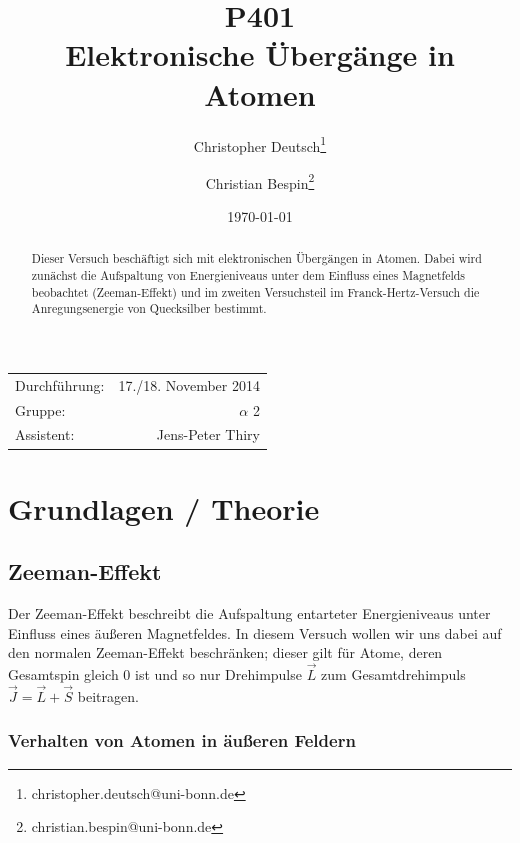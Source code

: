 \documentclass[11pt, a4paper]{article}
\title{P401 \\ Elektronische Übergänge in Atomen}
\author{Christopher Deutsch\footnote{christopher.deutsch@uni-bonn.de} \and Christian Bespin\footnote{christian.bespin@uni-bonn.de}}
\date{\today}
\begin{document}
\begin{titlepage}

\maketitle

\begin{center}
\begin{tabular}{l r}
Durchführung: & 17./18. November 2014 \\
Gruppe: & $\alpha$ 2 \\
Assistent: & Jens-Peter Thiry
\end{tabular}
\end{center}

\begin{abstract}
\noindent
Dieser Versuch beschäftigt sich mit elektronischen Übergängen in Atomen.
Dabei wird zunächst die Aufspaltung von Energieniveaus unter dem Einfluss eines Magnetfelds beobachtet (Zeeman-Effekt) und im zweiten Versuchsteil im Franck-Hertz-Versuch die Anregungsenergie von Quecksilber bestimmt.
\end{abstract}

\end{titlepage}

\tableofcontents
\newpage


\section{Grundlagen / Theorie}

\subsection{Zeeman-Effekt}

Der Zeeman-Effekt beschreibt die Aufspaltung entarteter Energieniveaus unter Einfluss eines äußeren Magnetfeldes.
In diesem Versuch wollen wir uns dabei auf den normalen Zeeman-Effekt beschränken; dieser gilt für Atome, deren Gesamtspin gleich $0$ ist und so nur Drehimpulse $\vec{L}$ zum Gesamtdrehimpuls $\vec{J}=\vec{L}+\vec{S}$ beitragen.

\subsubsection{Verhalten von Atomen in äußeren Feldern}
\label{sec:zeemaneffekt}
\end{document}
